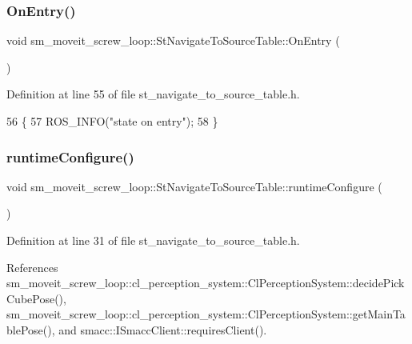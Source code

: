 \subsubsection{\texorpdfstring{On\+Entry()}{OnEntry()}}
{\footnotesize\ttfamily void sm\+\_\+moveit\+\_\+screw\+\_\+loop\+::\+St\+Navigate\+To\+Source\+Table\+::\+On\+Entry (\begin{DoxyParamCaption}{ }\end{DoxyParamCaption})\hspace{0.3cm}{\ttfamily [inline]}}



Definition at line 55 of file st\+\_\+navigate\+\_\+to\+\_\+source\+\_\+table.\+h.


\begin{DoxyCode}
56         \{
57             ROS\_INFO(\textcolor{stringliteral}{"state on entry"});
58         \}
\end{DoxyCode}
\mbox{\label{structsm__moveit__screw__loop_1_1StNavigateToSourceTable_aeb84c31aecd2ec86b6dddb51fc4845b9}} 
\subsubsection{\texorpdfstring{runtime\+Configure()}{runtimeConfigure()}}
{\footnotesize\ttfamily void sm\+\_\+moveit\+\_\+screw\+\_\+loop\+::\+St\+Navigate\+To\+Source\+Table\+::runtime\+Configure (\begin{DoxyParamCaption}{ }\end{DoxyParamCaption})\hspace{0.3cm}{\ttfamily [inline]}}



Definition at line 31 of file st\+\_\+navigate\+\_\+to\+\_\+source\+\_\+table.\+h.



References sm\+\_\+moveit\+\_\+screw\+\_\+loop\+::cl\+\_\+perception\+\_\+system\+::\+Cl\+Perception\+System\+::decide\+Pick\+Cube\+Pose(), sm\+\_\+moveit\+\_\+screw\+\_\+loop\+::cl\+\_\+perception\+\_\+system\+::\+Cl\+Perception\+System\+::get\+Main\+Table\+Pose(), and smacc\+::\+I\+Smacc\+Client\+::requires\+Client().



